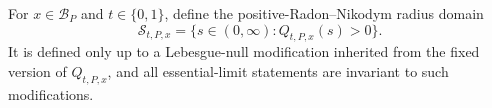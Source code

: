 For \(x\in\mathcal B_P\) and \(t\in\{0,1\}\), define the positive-Radon--Nikodym radius domain
\[
 \mathcal S_{t,P,x}=\{s\in(0,\infty):Q_{t,P,x}(s)>0\}.
\]
It is defined only up to a Lebesgue-null modification inherited from the fixed version of \(Q_{t,P,x}\), and all essential-limit statements are invariant to such modifications.
